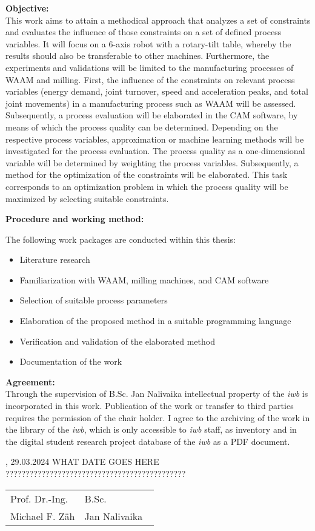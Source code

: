 \vspace{5mm}
\textbf{Objective:}\\
This work aims to attain a methodical approach that analyzes a set of constraints and 
evaluates the influence of those constraints on a set of defined process variables. It will focus
on a 6-axis robot with a rotary-tilt table, whereby the results should also be transferable to other machines. Furthermore, the experiments and validations will be limited to the 
manufacturing processes of WAAM and milling.
First, the influence of the constraints on relevant process variables (energy demand, joint 
turnover, speed and acceleration peaks, and total joint movements) in a manufacturing 
process such as WAAM will be assessed. Subsequently, a process evaluation will be
elaborated in the CAM software, by means of which the process quality can be determined.
Depending on the respective process variables, approximation or machine learning methods 
will be investigated for the process evaluation. The process quality as a one-dimensional 
variable will be determined by weighting the process variables. Subsequently, a method for 
the optimization of the constraints will be elaborated. This task corresponds to an optimization 
problem in which the process quality will be maximized by selecting suitable constraints.\newline


\vspace{5mm}
\textbf{Procedure and working method:}\newline

The following work packages are conducted within this thesis:

\begin{itemize}
\item Literature research
\item Familiarization with WAAM, milling machines, and CAM software
\item Selection of suitable process parameters
\item Elaboration of the proposed method in a suitable programming language
\item Verification and validation of the elaborated method
\item Documentation of the work

\newpage	 
\end{itemize}
\vspace{1.0cm}
\textbf{Agreement:}\\

Through the supervision of B.Sc. Jan Nalivaika intellectual property of the \textit{iwb} is incorporated in this work. Publication of the work or transfer to third parties requires the permission of the chair holder. I agree to the archiving of the work in the library of the \textit{iwb}, which is only accessible to \textit{iwb} staff, as inventory and in the digital student research project database of the \textit{iwb} as a PDF document.
\vfill

\IWBaddressCityChair, 29.03.2024 WHAT DATE GOES HERE ?????????????????????????????????????????????
\vspace{2.5cm}\\
\begin{tabular}{p{0.5\linewidth}p{0.5\linewidth} }
	Prof. Dr.-Ing.		& B.Sc.\\
Michael F. Zäh  	& Jan Nalivaika
\end{tabular}

